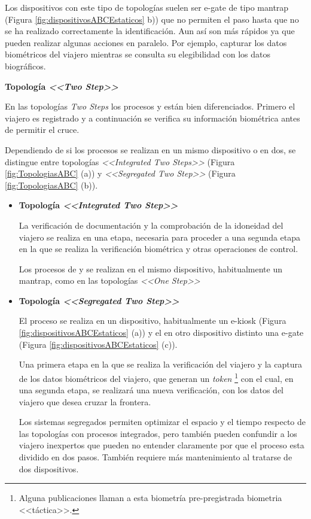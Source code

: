 Los dispositivos con este tipo de topologías suelen ser \gls{e-gate} de tipo \gls{mantrap} (Figura \ref{fig:dispositivosABCEstaticos} b)) que no permiten el paso hasta que no se ha realizado correctamente la identificación. Aun así  son más rápidos ya que pueden realizar algunas acciones en paralelo. Por ejemplo, capturar los datos biométricos del viajero mientras se consulta su elegibilidad con los datos biográficos.

\medskip
\textbf{Topología \textit{<<Two Step>>}}
\medskip

En las topologías \textit{Two Steps} los procesos  y  están bien diferenciados. Primero el viajero es registrado y a continuación se verifica su información biométrica antes de permitir el cruce. 

Dependiendo de si los procesos se realizan en un mismo dispositivo o en dos, se distingue entre topologías \textit{<<Integrated Two Steps>>} (Figura \ref{fig:TopologiasABC} (a)) y \textit{<<Segregated Two Step>>} (Figura \ref{fig:TopologiasABC} (b)).

\begin{itemize}
    \item 
    \textbf{Topología \textit{<<Integrated Two Step>>}}
    
    La verificación de documentación y la comprobación de la idoneidad del viajero se realiza en una etapa, necesaria para proceder a una segunda etapa en la que se realiza la verificación biométrica y otras operaciones de control.
    
    Los procesos de  y  se realizan en el mismo dispositivo, habitualmente un \gls{mantrap}, como en las topologías \textit{<<One Step>>}
    
    \item
    \textbf{Topología \textit{<<Segregated Two Step>>}}
    
    El proceso  se realiza en un dispositivo, habitualmente un \gls{e-kiosk} (Figura \ref{fig:dispositivosABCEstaticos} (a)) y el  en otro dispositivo distinto una \gls{e-gate} (Figura \ref{fig:dispositivosABCEstaticos} (c)).    
    
    Una primera etapa en la que se realiza la verificación del viajero y la captura de los datos biométricos del viajero, que generan un \textit{\gls{token}} \footnote{Alguna publicaciones llaman a esta biometría pre-pregistrada \gls{biometria} <<táctica>>.} con el cual, en una segunda etapa, se realizará una nueva verificación, con los datos del viajero que desea cruzar la frontera.

    Los sistemas segregados permiten optimizar el espacio y el tiempo respecto de las topologías con procesos integrados, pero también pueden confundir a los viajero inexpertos que pueden no entender claramente por que el proceso esta dividido en dos pasos. También requiere más mantenimiento al tratarse de dos dispositivos.
\end{itemize}

